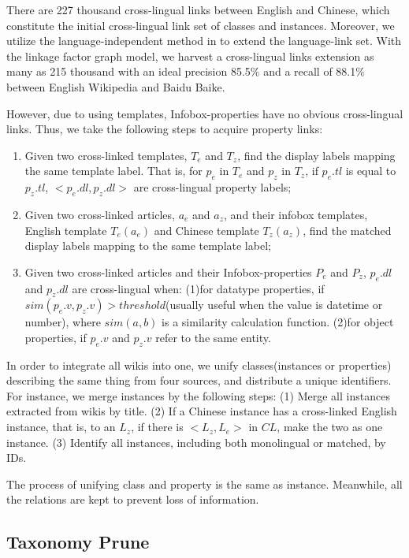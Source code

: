 \documentclass[runningheads,a4paper]{llncs}
\begin{document}
There are 227 thousand cross-lingual links between English and Chinese, which constitute the initial cross-lingual link set of classes and instances. Moreover, we utilize the language-independent method in \cite{wang2012cross} to extend the language-link set. With the linkage factor graph model, we harvest a cross-lingual links extension as many as 215 thousand with an ideal precision 85.5\% and a recall of 88.1\% between English Wikipedia and Baidu Baike.

However, due to using templates, Infobox-properties have no obvious cross-lingual links. Thus, we take the following steps to acquire property links:
\begin{enumerate}
    \item Given two cross-linked templates, $T_{e}$ and $T_{z}$, find the display labels mapping the same template label. That is, for $p_{e}$ in $T_{e}$ and $p_{z}$ in $T_{z}$, if $p_{e}.tl$ is equal to $p_{z}.tl$, $<p_{e}.dl,p_{z}.dl>$ are cross-lingual property labels;
    \item Given two cross-linked articles, $a_{e}$ and $a_{z}$, and their infobox templates, English template $T_{e}(a_{e})$ and Chinese template $T_{z}(a_{z})$, find the matched display labels mapping to the same template label;
    \item Given two cross-linked articles and their Infobox-properties $P_{e}$ and $P_{z}$, $p_{e}.dl$ and $p_{z}.dl$ are cross-lingual when: (1)for datatype properties, if $sim(p_{e}.v, p_{z}.v) > threshold$(usually useful when the value is datetime or number), where $sim(a,b)$ is a similarity calculation function. (2)for object properties, if $p_{e}.v$ and ${p_{z}.v}$ refer to the same entity. 
\end{enumerate}

In order to integrate all wikis into one, we unify classes(instances or properties) describing the same thing from four sources, and distribute a unique identifiers. For instance, we merge instances by the following steps: (1) Merge all instances extracted from wikis by title. (2) If a Chinese instance has a cross-linked English instance, that is, to an $L_{z}$, if there is $<L_{z}, L_{e}>$ in $CL$, make the two as one instance. (3) Identify all instances, including both monolingual or matched, by IDs.

The process of unifying class and property is the same as instance. Meanwhile, all the relations are kept to prevent loss of information.

\subsection{Taxonomy Prune}
\end{document}
